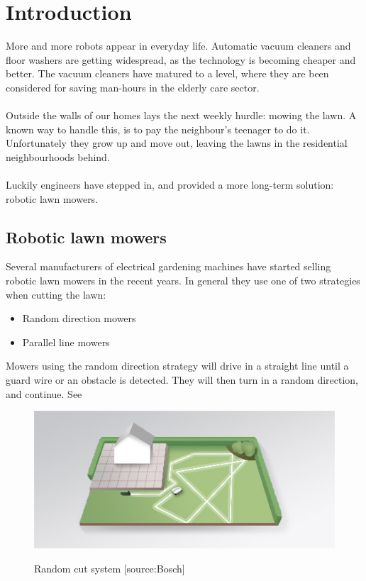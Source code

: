 \chapter{Introduction}

More and more robots appear in everyday life. Automatic vacuum cleaners and floor washers are getting widespread, as the technology is becoming cheaper and better. The vacuum cleaners have matured to a level, where they are been considered for saving man-hours in the elderly care sector.\\\\
\noindent
Outside the walls of our homes lays the next weekly hurdle: mowing the lawn. A known way to handle this, is to pay the neighbour's teenager to do it. Unfortunately they grow up and move out, leaving the lawns in the residential neighbourhoods behind.\\\\
\noindent
Luckily engineers have stepped in, and provided a more long-term solution: robotic lawn mowers.

\section{Robotic lawn mowers}
Several manufacturers of electrical gardening machines have started selling robotic lawn mowers in the recent years. In general they use one of two strategies when cutting the lawn:
\begin{itemize}
	\item Random direction mowers
	\item Parallel line mowers
\end{itemize}

\noindent
Mowers using the random direction strategy will drive in a straight line until a guard wire or an obstacle is detected. They will then turn in a random direction, and continue. See 

\begin{figure}[H]
\centering
\includegraphics[scale=0.8]{figures/noLogiCut.jpg} 
\label{fig:randomcut}
\caption{Random cut system [source:Bosch]} 
\end{figure}

